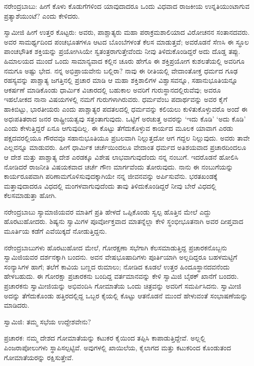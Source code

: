 ನರೇಂದ್ರಬಾಬು: ಹೀಗೆ ಕೊಳು ಕೊಡುಗೆಗಳಿಂದ ಯಾವುದಾದರೂ ಒಂದು ವಿಧವಾದ ರಾಜಕೀಯ ಉನ್ನತಿಯುಂಟಾಗುವ ಪ್ರತ್ಯಾಶೆಯುಂಟೆ? ಎಂದು ಕೇಳಿದರು.

ಸ್ವಾಮೀಜಿ ಹೀಗೆ ಉತ್ತರ ಕೊಟ್ಟರು: ಅವರು, ಪಾಶ್ಚಾತ್ಯರು ಮಹಾ ಪರಾಕ್ರಮಶಾಲಿಯಾದ ವಿರೋಚನನ ಸಂತಾನದವರು. ಅವರ ಸಾಮರ್ಥ್ಯದಿಂದ ಪಂಚಭೂತಗಳೂ ಆಟದ ಬೊಂಬೆಗಳಂತೆ ಕೆಲಸ ಮಾಡುತ್ತವೆ; ಅವರೊಡನೆ ಸೆಣಸಿ ಈ ಸ್ಥೂಲ ಪಾಂಚಭೌತಿಕ ಶಕ್ತಿಯನ್ನು ಪ್ರಯೋಗಿಸಿಯೇ ಸ್ವತಂತ್ರರಾಗುತ್ತೇವೆಂದು ನೀವು ತಿಳಿದುಕೊಂಡಿದ್ದರೆ ಅದು ದೊಡ್ಡ ತಪ್ಪು. ಹಿಮಾಲಯದ ಮುಂದೆ ಒಂದು ಸಾಮಾನ್ಯವಾದ ಕಲ್ಲಿನ ಚೂರು ಹೇಗೊ ಈ ಶಕ್ತಿಪ್ರಯೋಗ ಕುಶಲತೆಯಲ್ಲಿ ಅವರಿಗೂ ನಮಗೂ ಅಷ್ಟು ಭೇದ. ನನ್ನ ಅಭಿಪ್ರಾಯವೇನು ಬಲ್ಲಿರಾ? ನಾವು ಈ ರೀತಿಯಲ್ಲಿ ವೇದಾಂತೋಕ್ತ ಧರ್ಮದ ಗೂಢ ರಹಸ್ಯವನ್ನು ಪಾಶ್ಚಾತ್ಯ ಜಗತ್ತಿನಲ್ಲಿ ಪ್ರಚಾರ ಮಾಡಿ ಆ ಮಹಾ ಶಕ್ತಿಶಾಲಿಗಳ ವಿಶ್ವಾಸವನ್ನೂ, ಸಹಾನುಭೂತಿಯನ್ನೂ ಆಕರ್ಷಣೆ ಮಾಡಿಕೊಂಡು ಧಾರ್ಮಿಕ ವಿಚಾರದಲ್ಲಿ ಬಹುಕಾಲ ಅವರಿಗೆ ಗುರುಸ್ಥಾನದಲ್ಲಿರುವೆವು; ಅವರೂ ಇಹಲೋಕದ ನಾನಾ ವಿಷಯಗಳಲ್ಲಿ ನಮಗೆ ಗುರುಗಳಾಗಿರುವರು. ಧರ್ಮವೆಂಬ ಪದಾರ್ಥವನ್ನು ಅವರ ಕೈಗೆ ಹಾಕಿಬಿಟ್ಟು, ಭಾರತೀಯರು ಎಂದು ಪಾಶ್ಚಾತ್ಯರ ಪದತಲದಲ್ಲಿ ಧರ್ಮವನ್ನು ಕಲಿಯಲು ಕುಳಿತುಕೊಳ್ಳುವರೊ ಅಂದೆ ಈ ಅಧಃಪತಿತರಾದ ಜನರ ರಾಷ್ಟ್ರೀಯತ್ವವು ಸತ್ತಂತಾಗುವುದು. ಒಟ್ಟಿಗೆ ಅರಚುತ್ತ ಅವರನ್ನು ‘ಇದು ಕೊಡಿ’ ‘ಅದು ಕೊಡಿ’ ಎಂದು ಕೇಳುತ್ತಿದ್ದರೆ ಏನೂ ಆಗುವುದಿಲ್ಲ. ಈ ಕೊಟ್ಟು ತೆಗೆದುಕೊಳ್ಳುವ ಕಾರ್ಯದ ಮೂಲಕ ಯಾವಾಗ ಎರಡು ಪಕ್ಷದವರಲ್ಲಿಯೂ ಗೌರವವೂ ಸಹಾನುಭೂತಿಯೂ ಪ್ರಬಲವಾಗಿ ನಿಲ್ಲುತ್ತದೋ ಆಗ ಗದ್ದಲ ನಿಲ್ಲುವುದು. ಅವರು ತಾವೇ ಎಲ್ಲವನ್ನೂ ಮಾಡುವರು. ಹೀಗೆ ಧಾರ್ಮಿಕ ಚರ್ಚೆಯಿಂದಲೂ ವೇದಾಂತ ಧರ್ಮದ ಅತಿಶಯವಾದ ಪ್ರಚಾರದಿಂದಲೂ ಆ ದೇಶ ಮತ್ತು ಪಾಶ್ಚಾತ್ಯ ದೇಶ ಎರಡಕ್ಕೂ ವಿಶೇಷ ಲಾಭವಾಗುವುದೆಂದು ನನ್ನ ನಂಬುಗೆ. ಇದರೊಡನೆ ಹೋಲಿಸಿ ನೋಡಿದರೆ ರಾಜನೀತಿ ವಿಷಯಕವಾದ ಚರ್ಚೆ ಗೌಣ ಮಾರ್ಗವೆಂದು ತೋರುವುದು. ನಾನು ಈ ನಂಬುಗೆಯನ್ನು ಕಾರ್ಯರೂಪವಾಗಿ ಪರಿಣಾಮಗೊಳಿಸುವುದಕ್ಕಾಗಿಯೇ ನನ್ನ ಜೀವನವನ್ನು ಅರ್ಪಿಸುವೆನು. ಭರತಖಂಡಕ್ಕೆ ಮತ್ತಾವುದಾದರೂ ವಿಧದಲ್ಲಿ ಮಂಗಳವಾಗುವುದೆಂದು ತಾವು ತಿಳಿದುಕೊಂಡಿದ್ದರೆ ನೀವು ಬೇರೆ ವಿಧದಲ್ಲಿ ಕೆಲಸಮಾಡುತ್ತಾ ಹೋಗಿ.

ನರೇಂದ್ರಬಾಬು ಸ್ಯಾಮಾಜಿಯವರ ಮಾತಿಗೆ ಪ್ರತಿ ಹೇಳದೆ ಒಪ್ಪಿಕೊಂಡು ಸ್ವಲ್ಪ ಹೊತ್ತಿನ ಮೇಲೆ ಎದ್ದು ಹೊರಟುಹೋದರು. ಶಿಷ್ಯನು ಸ್ವಾಮಿಗಳ ಪೂರ್ವೋಕ್ತವಾದ ಮಾತನ್ನೆಲ್ಲಾ ಕೇಳಿ ಸ್ಥಂಭೀಭೂತನಾಗಿ ಅವರ ದೀಪ್ತವಾದ ಮೂರ್ತಿಯ ಕಡೆಗೆ ಎವೆಯಿಕ್ಕದೆ ನೋಡುತ್ತಿದ್ದನು.

ನರೇಂದ್ರಬಾಬುಗಳು ಹೊರಟುಹೋದ ಮೇಲೆ, ಗೋರಕ್ಷಣಾ ಸಭೆಗಾಗಿ ಕೆಲಸಮಾಡುತ್ತಿದ್ದ ಪ್ರಚಾರಕನೊಬ್ಬನು ಸ್ವಾಮಿಜಿಯವರ ದರ್ಶನಕ್ಕಾಗಿ ಬಂದನು. ಅವನ ವೇಷಭೂಷಾದಿಗಳು ಪೂರ್ತಿಯಾಗಿ ಅಲ್ಲದಿದ್ದರೂ ಬಹಳಮಟ್ಟಿಗೆ ಸಂನ್ಯಾಸಿಗಳ ಹಾಗೆ; ತಲೆಗೆ ಕಾವಿಯ ಬಣ್ಣದ ರುಮಾಲು; ನೋಡಿದ ಕೂಡಲೆ ಉತ್ತರ ಹಿಂದೂಸ್ಥಾನದವನೆಂದು ಹೇಳಬಹುದು. ಈ ಗೋರಕ್ಷಾ ಪ್ರಚಾರಕನು ಬಂದಿದ್ದ ವರ್ತಮಾನವನ್ನು ಕೇಳಿ ಸ್ವಾಮಿಜಿ ಬೈಠಕ್ ಖಾನೆಗೆ ಬಂದರು. ಪ್ರಚಾರಕನು ಸ್ವಾಮೀಜಿಯನ್ನು ಅಭಿವಂದಿಸಿ ಗೋಮಾತೆಯ ಒಂದು ಚಿತ್ರವನ್ನು ಅವರಿಗೆ ಸಮರ್ಪಿಸಿದನು. ಸ್ವಾಮೀಜಿ ಅದನ್ನು ತೆಗೆದುಕೊಂಡು ಹತ್ತಿರದಲ್ಲಿದ್ದ ಒಬ್ಬರ ಕೈಯಲ್ಲಿ ಕೊಟ್ಟು ಆತನೊಡನೆ ಮುಂದೆ ಹೇಳುವಂತೆ ಸಂಭಾಷಣೆಯನ್ನು ಮಾಡಿದರು.

ಸ್ವಾಮಿಜಿ: ತಮ್ಮ ಸಭೆಯ ಉದ್ದೇಶವೇನು?

ಪ್ರಚಾರಕ: ನಮ್ಮ ದೇಶದ ಗೋಮಾತೆಯನ್ನು ಕಟುಕರ ಕೈಯಿಂದ ತಪ್ಪಿಸಿ ಕಾಪಾಡುತ್ತಿದ್ದೇವೆ. ಅಲ್ಲಲ್ಲಿ ಪಿಂಜರಾಪೋಲುಗಳು ಸ್ಥಾಪಿಸಲ್ಪಟ್ಟಿವೆ. ಅವುಗಳಲ್ಲಿ ಖಾಯಿಲೆಯ, ಕೈಲಾಗದ ಮತ್ತು ಕಟುಕರಿಂದ ಕೊಂಡುತಂದ ಗೋಮಾತೆಯರನ್ನು ರಕ್ಷಿಸುತ್ತೇವೆ.

